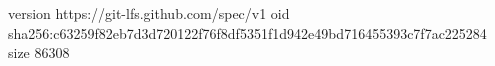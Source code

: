 version https://git-lfs.github.com/spec/v1
oid sha256:c63259f82eb7d3d720122f76f8df5351f1d942e49bd716455393c7f7ac225284
size 86308

